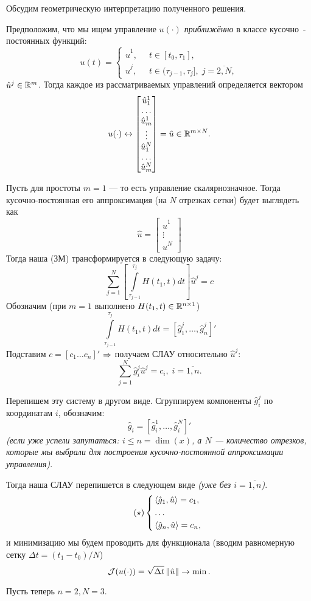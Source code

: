 Обсудим геометрическую интерпретацию полученного решения.

Предположим, что мы ищем управление $u(\cdot)$ \textit{приближённо} в классе кусочно~-постоянных функций:
$$
u(t) = \left\{
    \begin{aligned}
        \hat{u}^1, & \;\; t \in [t_0, \tau_1],\\
        \hat{u}^j, & \;\; t \in (\tau_{j-1}, \tau_{j}], \; j = \overline{2, N},
    \end{aligned}
\right.
$$
$\hat{u}^j \in \mathbb{R}^m$. Тогда каждое из рассматриваемых управлений определяется вектором
$$
u(\cdot) \leftrightarrow \begin{bmatrix}
    \hat{u}^1_1 \\ \ldots \\ \hat{u}^1_m \\ \vdots \\ \hat{u}^N_1 \\ \ldots \\ \hat{u}^N_m
\end{bmatrix} = \hat{u} \in \mathbb{R}^{m \times N}.
$$

Пусть для простоты $m = 1$ --- то есть управление скалярнозначное. Тогда кусочно-постоянная его аппроксимация (на $N$ отрезках сетки) будет выглядеть как
$$
\hat{u} = \begin{bmatrix}
    \hat{u}^1 \\ \vdots \\ \hat{u}^N
\end{bmatrix}
$$
Тогда наша (ЗМ) трансформируется в следующую задачу:
$$
\sum\limits_{j=1}^{N} \left[ \int\limits_{\tau_{j-1}}^{\tau_j} H(t_1, t) dt \right] \hat{u}^j = c
$$
Обозначим (при $m = 1$ выполнено ${H(t_1, t) \in \mathbb{R}^{n \times 1}}$)
$$
\int\limits_{\tau_{j-1}}^{\tau_j} H(t_1, t) dt = [\hat{g}^j_1, \ldots, \hat{g}^j_n]'
$$
Подставим $c = [c_1  \ldots c_n]'$ $\operatorname*{\Rightarrow}$ получаем СЛАУ относительно $\hat{u}^j$:
$$
\sum\limits_{j=1}^{N} \hat{g}^j_i \hat{u}^j = c_i, \; i = \overline{1, n}.
$$

Перепишем эту систему в другом виде.
Сгруппируем компоненты $\hat{g}^j_i$ по координатам $i$, обозначим:
$$
\hat{g}_i = [\hat{g}^1_i, \ldots,  \hat{g}^N_i]'
$$
\textit{(если уже успели запутаться: $i \leqslant n = \dim(x)$, а $N$ --- количество отрезков, которые мы выбрали для построения кусочно-постоянной аппроксимации управления)}.

Тогда наша СЛАУ перепишется в следующем виде \textit{(уже без $i = \overline{1, n}$)}.
\begin{equation} \tag{$\star$}
\left\{
    \begin{aligned}
        & \left < \hat{g}_1, \hat{u} \right > = c_1, \\
        & \ldots\\
        & \left < \hat{g}_n, \hat{u} \right > = c_n,
    \end{aligned}
\right.
\end{equation}
и минимизацию мы будем проводить для функционала (вводим равномерную сетку $\Delta t = (t_1 - t_0) / N$)
$$
\mathcal{J}(u(\cdot)) = \sqrt{\Delta t} \left\lVert \hat{u} \right\rVert \to \min.
$$

Пусть теперь $n = 2, N = 3$.